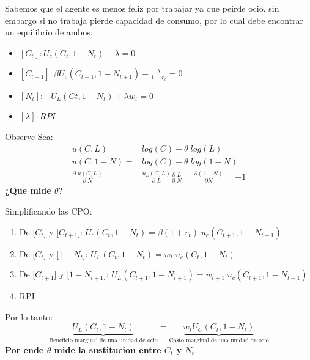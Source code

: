 \documentclass[12pt]{article}
\begin{document}
 Sabemos que el agente es menos feliz por trabajar ya que peirde ocio, sin embargo si no trabaja pierde capacidad de consumo, por lo cual debe encontrar un equilibrio de ambos. \\
 \begin{itemize}
     \item $[C_t]: U_c(C_t,1-N_t)-\lambda =0$\\
     \item $[C_{t+1}]: \beta U_c(C_{t+1}, 1 - N_{t+1})-\frac{\lambda}{1+r_t}=0$\\
     \item $[N_t]:-U_L(Ct,1-N_t)+\lambda w_t=0$
     \item $[\lambda]: RPI$
 \end{itemize}
 \begin{comentarioprofe}Observe
     Sea: 
     \begin{align*}
         u(C,L)=& log(C) + \theta \; log(L) \\
         u(C,1-N)=& log(C) + \theta \; log(1-N) \\
         \frac{\partial \;u(C,L)}{\partial \; N}=&\frac{u_L(C,L)}{\partial\; L} \frac{\partial\; L}{\partial\;N}=\frac{\partial(1-N)}{\partial N}=-1
     \end{align*}
     \textbf{¿Que mide $\theta$?}
 \end{comentarioprofe}

 Simplificando las CPO:\\
 \begin{enumerate}
    \item De [$C_t$] y [$C_{t+1}$]: 
     $U_c(C_t,1-N_t)=\beta(1+r_t)\;u_c(C_{t+1},1-N_{t+1})$
    \item De [$C_t$] y [$1-N_t$]: 
     $U_L(C_{t},1-N_{t})=w_t\;u_c(C_{t},1-N_{t})$
    \item De [$C_{t+1}$] y [$1-N_{t+1}$]: 
     $U_L(C_{t+1},1-N_{t+1})=w_{t+1}\;u_c(C_{t+1},1-N_{t+1})$
    \item RPI 
 \end{enumerate}

 Por lo tanto: 
 $$\underbrace{U_L(C_t,1-N_t)}_{\text{Beneficio marginal de una unidad de ocio}}=\underbrace{w_tU_C(C_t,1-N_t)}_{\text{Costo marginal de una unidad de ocio}}$$
 \textbf{Por ende $\theta$ mide la sustitucion entre $C_t$ y $N_t$}
\end{document}
